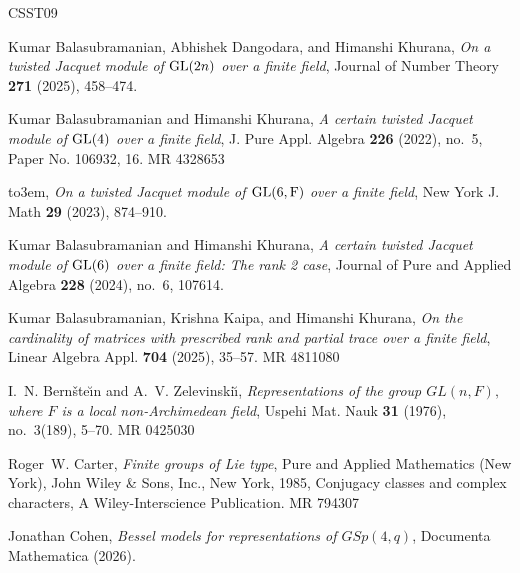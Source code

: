 \documentclass[reqno]{amsart}
\theoremstyle{definition}
\theoremstyle{remark}
\numberwithin{equation}{section}
\begin{document}
{{%




%
%

\providecommand{\bysame}{\leavevmode\hbox to3em{\hrulefill}\thinspace}
\providecommand{\MR}{\relax\ifhmode\unskip\space\fi MR }
\providecommand{\MRhref}[2]{%
  \href{http://www.ams.org/mathscinet-getitem?mr=#1}{#2}
}
\providecommand{\href}[2]{#2}
\begin{thebibliography}{CSST09}

Kumar Balasubramanian, Abhishek Dangodara, and Himanshi Khurana, \emph{On a twisted {J}acquet module of {${\rm GL}(2n)$} over a finite field}, Journal of Number Theory \textbf{271} (2025), 458--474.

Kumar Balasubramanian and Himanshi Khurana, \emph{A certain twisted {J}acquet module of {${\rm GL}(4)$} over a finite field}, J. Pure Appl. Algebra \textbf{226} (2022), no.~5, Paper No. 106932, 16. \MR{4328653}

\bysame, \emph{On a twisted {J}acquet module of {${\rm GL}(6,{\rm F})$} over a finite field}, New York J. Math \textbf{29} (2023), 874--910.

Kumar Balasubramanian and Himanshi Khurana, \emph{A certain twisted {J}acquet module of {${\rm GL}(6)$} over a finite field: The rank 2 case}, Journal of Pure and Applied Algebra \textbf{228} (2024), no.~6, 107614.

Kumar Balasubramanian, Krishna Kaipa, and Himanshi Khurana, \emph{On the cardinality of matrices with prescribed rank and partial trace over a finite field}, Linear Algebra Appl. \textbf{704} (2025), 35--57. \MR{4811080}

I.~N. Bern\v{s}te\u{\i}n and A.~V. Zelevinski\u{\i}, \emph{Representations of the group {$GL(n,F),$} where {$F$} is a local non-{A}rchimedean field}, Uspehi Mat. Nauk \textbf{31} (1976), no.~3(189), 5--70. \MR{0425030}

Roger~W. Carter, \emph{Finite groups of {L}ie type}, Pure and Applied Mathematics (New York), John Wiley \& Sons, Inc., New York, 1985, Conjugacy classes and complex characters, A Wiley-Interscience Publication. \MR{794307}

Jonathan Cohen, \emph{Bessel models for representations of {$GSp(4, q)$}}, Documenta Mathematica (2026).


\end{thebibliography}}}
\end{document}
